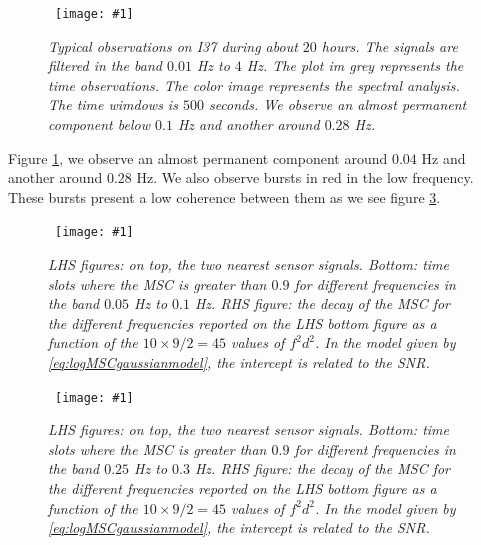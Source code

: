 \documentclass[a4paper, 12pt]{report}
\newcommand{\figscale}[4]{
\begin{figure}[hbtp]
\centerline{
    \hbox{ \texttt{[image: \#1]} }
}
\begin{center}
\parbox{14 cm}
{
    \caption{\protect\small\it  {#2}}
    \label {#3}
}
\end{center}

\end{figure}}
\begin{document}
\figscale{../figures/tempspectanalysisI3720140905.pdf}{Typical observations on I37 during about $20$ hours. The signals are filtered in the band $0.01$ Hz to $4$ Hz. The plot im grey represents the time observations. The color image represents the spectral analysis. The time wimdows is $500$ seconds. We observe an almost permanent component below $0.1$ Hz and another around $0.28$ Hz.}{fig:tempspectanalysisI3720140905}{0.67}

Figure \ref{fig:tempspectanalysisI3720140905}, we observe an almost permanent component around $0.04$ Hz and another around $0.28$ Hz. We also observe bursts in red in the low frequency. These bursts present a low coherence between them as we see figure \ref{}.



\newcommand{\paquet}[2]{
\figscale{../figures/#1}{LHS figures: on top, the two nearest sensor signals. Bottom: time slots where the MSC is greater than $0.9$ for different frequencies in the band $0.05$ Hz to $0.1$ Hz. RHS figure: the decay of the MSC for the different frequencies reported on the LHS bottom figure as a function of the $10\times 9/2=45$ values of $f^2d^2$.  In the model given by \eqref{eq:logMSCgaussianmodel}, the intercept is related to the SNR.}{}{0.6}

\figscale{../figures/#2}
{LHS figures: on top, the two nearest sensor signals. Bottom: time slots where the MSC is greater than $0.9$ for different frequencies in the band $0.25$ Hz to $0.3$ Hz. RHS figure: the decay of the MSC for the different frequencies reported on the LHS bottom figure as a function of the $10\times 9/2=45$ values of $f^2d^2$.  In the model given by \eqref{eq:logMSCgaussianmodel}, the intercept is related to the SNR.}{}{0.6}
}


\paquet{coherence2nearestI3720140902LOW.pdf}{coherence2nearestI3720140902HIGH.pdf}
\end{document}
